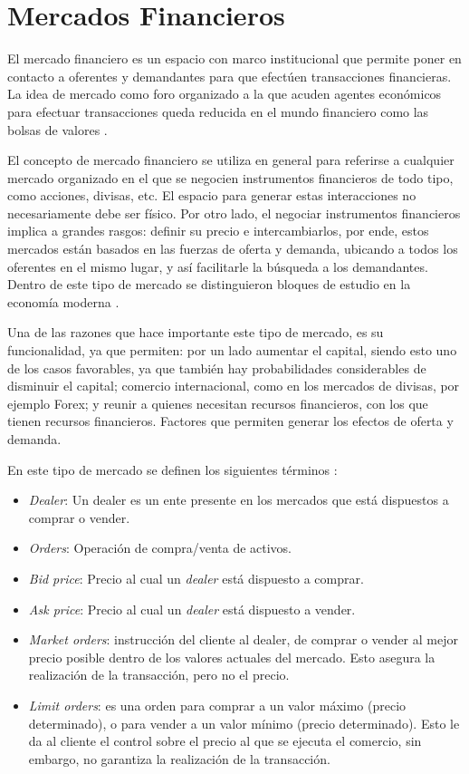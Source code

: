 \section{Mercados Financieros}

El mercado financiero es un espacio con marco institucional que permite poner
en contacto a oferentes y demandantes para que efectúen transacciones
financieras. La idea de mercado como foro organizado a la que acuden agentes
económicos para efectuar transacciones queda reducida en el mundo financiero
como las bolsas de valores \cite{mishkin2006financial}.

El concepto de mercado financiero se utiliza en general para referirse a
cualquier mercado organizado en el que se negocien instrumentos financieros de
todo tipo, como acciones, divisas, etc. El espacio para generar estas
interacciones no necesariamente debe ser físico. Por otro lado, el negociar
instrumentos financieros implica a grandes rasgos: definir su precio e
intercambiarlos, por ende, estos mercados están basados en las fuerzas de
oferta y demanda, ubicando a todos los oferentes en el mismo lugar, y así
facilitarle la búsqueda a los demandantes. Dentro de este tipo de mercado se
distinguieron bloques de estudio en la economía moderna
\cite{jensen1984theory}.

Una de las razones que hace importante este tipo de mercado, es su
funcionalidad, ya que permiten: por un lado aumentar el capital, siendo esto
uno de los casos favorables, ya que también hay probabilidades considerables de
disminuir el capital; comercio internacional, como en los mercados de divisas,
por ejemplo Forex; y reunir a quienes necesitan recursos financieros, con los
que tienen recursos financieros. Factores que permiten generar los efectos de
oferta y demanda.

En este tipo de mercado se definen los siguientes términos
\cite{nevmyvaka2003electronic}:
\begin{itemize}
    \item \emph{Dealer}: Un dealer es un ente presente en los mercados que está
    dispuestos a comprar o vender.
    \item \emph{Orders}: Operación de compra/venta de activos.
    \item \emph{Bid price}: Precio al cual un \emph{dealer} está dispuesto a
    comprar.
    \item \emph{Ask price}: Precio al cual un \emph{dealer} está dispuesto a
    vender.
    \item \emph{Market orders}: instrucción del cliente al dealer, de comprar o
    vender al mejor precio posible dentro de los valores actuales del mercado.
    Esto asegura la realización de la transacción, pero no el precio.
    \item \emph{Limit orders}: es una orden para comprar a un valor máximo
    (precio determinado), o para vender a un valor mínimo (precio determinado).
    Esto le da al cliente el control sobre el precio al que se ejecuta el
    comercio, sin embargo, no garantiza la realización de la transacción.
\end{itemize}

